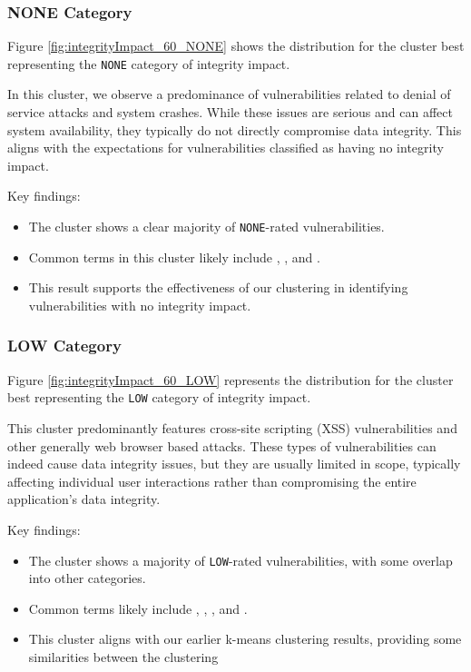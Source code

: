 \documentclass[12pt]{article}
\begin{document}
\subsubsection*{NONE Category}

Figure \ref{fig:integrityImpact_60_NONE} shows the distribution for the cluster best representing
the \texttt{NONE} category of integrity impact.


In this cluster, we observe a predominance of vulnerabilities related to denial of service attacks
and system crashes. While these issues are serious and can affect system availability, they
typically do not directly compromise data integrity. This aligns with the expectations for
vulnerabilities classified as having no integrity impact.

Key findings:
\begin{itemize}

	\item The cluster shows a clear majority of \texttt{NONE}-rated vulnerabilities.

	\item Common terms in this cluster likely include , , and
	      .

	\item This result supports the effectiveness of our clustering in identifying vulnerabilities
	      with no integrity impact.

\end{itemize}

\subsubsection*{LOW Category}

Figure \ref{fig:integrityImpact_60_LOW} represents the distribution for the cluster best representing the \texttt{LOW} category of integrity impact.

This cluster predominantly features cross-site scripting (XSS) vulnerabilities and other generally
web browser based attacks. These types of vulnerabilities can indeed cause data integrity issues, but
they are usually limited in scope, typically affecting individual user interactions rather than
compromising the entire application's data integrity.

Key findings:
\begin{itemize}

	\item The cluster shows a majority of \texttt{LOW}-rated vulnerabilities, with some overlap into
	      other categories.

	\item Common terms likely include , , , and .

	\item This cluster aligns with our earlier k-means clustering results, providing some
	      similarities between the clustering
\end{itemize}
\end{document}
